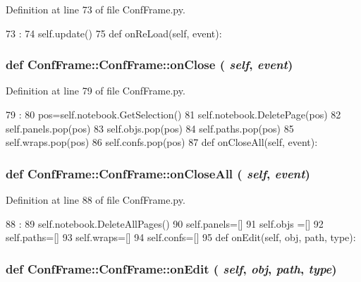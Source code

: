 Definition at line 73 of file ConfFrame.py.


\begin{DoxyCode}
73                              :
74         self.update()
75 
    def onReLoad(self, event):
\end{DoxyCode}
\hypertarget{classConfFrame_1_1ConfFrame_a15f8f6f018afdebf8e6de863f41d1743}{
\subsubsection[{onClose}]{\setlength{\rightskip}{0pt plus 5cm}def ConfFrame::ConfFrame::onClose ( {\em self}, \/   {\em event})}}
\label{classConfFrame_1_1ConfFrame_a15f8f6f018afdebf8e6de863f41d1743}


Definition at line 79 of file ConfFrame.py.


\begin{DoxyCode}
79                             :
80         pos=self.notebook.GetSelection()
81         self.notebook.DeletePage(pos)
82         self.panels.pop(pos)
83         self.objs.pop(pos)
84         self.paths.pop(pos)
85         self.wraps.pop(pos)
86         self.confs.pop(pos)
87 
    def onCloseAll(self, event):
\end{DoxyCode}
\hypertarget{classConfFrame_1_1ConfFrame_acbfa2caa776d95eefb6bcb5e26eb9dc6}{
\subsubsection[{onCloseAll}]{\setlength{\rightskip}{0pt plus 5cm}def ConfFrame::ConfFrame::onCloseAll ( {\em self}, \/   {\em event})}}
\label{classConfFrame_1_1ConfFrame_acbfa2caa776d95eefb6bcb5e26eb9dc6}


Definition at line 88 of file ConfFrame.py.


\begin{DoxyCode}
88                                :
89         self.notebook.DeleteAllPages()
90         self.panels=[]
91         self.objs =[]
92         self.paths=[]
93         self.wraps=[]
94         self.confs=[]
95 
    def onEdit(self, obj, path, type):
\end{DoxyCode}
\hypertarget{classConfFrame_1_1ConfFrame_a85437dc1587288750f6a1357e1b4d84c}{
\subsubsection[{onEdit}]{\setlength{\rightskip}{0pt plus 5cm}def ConfFrame::ConfFrame::onEdit ( {\em self}, \/   {\em obj}, \/   {\em path}, \/   {\em type})}}
\label{classConfFrame_1_1ConfFrame_a85437dc1587288750f6a1357e1b4d84c}


